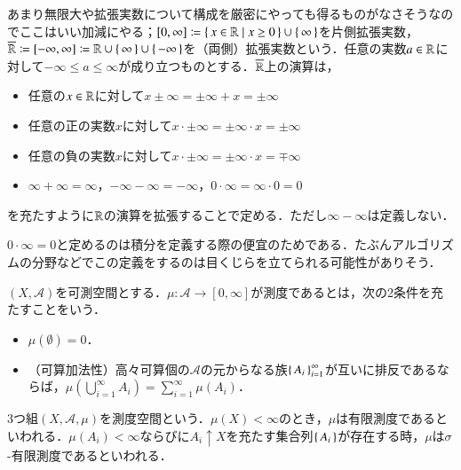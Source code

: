\begin{defi}
あまり無限大や拡張実数について構成を厳密にやっても得るものがなさそうなのでここはいい加減にやる；$[0,\infty] \coloneqq \set{x \in \mathbb{R}| x \geq 0} \cup \set{\infty}$を片側拡張実数，$\overline{\mathbb{R}} \coloneqq [-\infty, \infty] \coloneqq \mathbb{R} \cup \set{\infty} \cup \set{-\infty}$を（両側）拡張実数という．任意の実数$a \in \mathbb{R}$に対して$- \infty \leq a \leq \infty$が成り立つものとする．$\overline{\mathbb{R}}$上の演算は，
\begin{itemize}
\item 任意の$x \in \mathbb{R}$に対して$x \pm \infty = \pm \infty + x = \pm \infty$
\item 任意の正の実数$x$に対して$x \cdot \pm \infty = \pm \infty \cdot x = \pm \infty$
\item 任意の負の実数$x$に対して$x \cdot \pm \infty = \pm \infty \cdot x = \mp \infty$
\item $\infty + \infty = \infty$，$-\infty - \infty = - \infty$，$0 \cdot \infty = \infty \cdot 0 = 0$
\end{itemize}を充たすように$\mathbb{R}$の演算を拡張することで定める．ただし$\infty - \infty$は定義しない．
\end{defi}

\begin{dig}
$0 \cdot \infty = 0$と定めるのは積分を定義する際の便宜のためである．たぶんアルゴリズムの分野などでこの定義をするのは目くじらを立てられる可能性がありそう．
\end{dig}

\begin{defi}
$(X,\mathcal{A})$を可測空間とする．$\mu \colon \mathcal{A} \to [0,\infty]$が測度であるとは，次の2条件を充たすことをいう．
\begin{itemize}
\item $\mu(\emptyset) = 0$．
\item （可算加法性）高々可算個の$\mathcal{A}$の元からなる族$\set{A_i}_{i=1}^\infty$が互いに排反であるならば，$\mu\left(\bigcup_{i=1}^\infty A_i \right) = \sum_{i=1}^\infty \mu(A_i)$．
\end{itemize}
3つ組$(X,\mathcal{A},\mu)$を測度空間という．$\mu(X) < \infty$のとき，$\mu$は有限測度であるといわれる．$\mu(A_i) < \infty$ならびに$A_i \uparrow X$を充たす集合列$\set{A_i}$が存在する時，$\mu$は$\sigma$-有限測度であるといわれる．
\end{defi}

